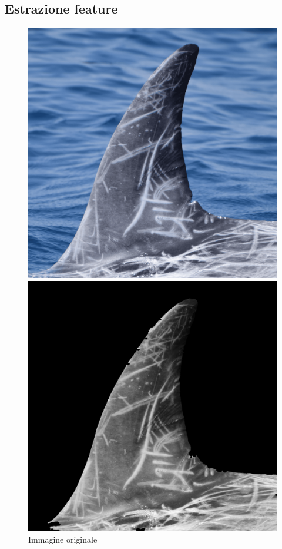 \documentclass[a4paper,12pt]{report}
\begin{document}
    \subsection{Estrazione feature}
    \begin{figure}[H]
      \centering
      \begin{minipage}{0.3\textwidth}
        \centering
        \includegraphics[width=\textwidth]{assets/images/features_extraction/original.png}   
        \caption{Immagine originale}
      \end{minipage}
      \begin{minipage}{0.3\textwidth}
        \centering
        \includegraphics[width=\textwidth]{assets/images/features_extraction/gray.png}  

\end{minipage}
\end{figure}
\end{document}
